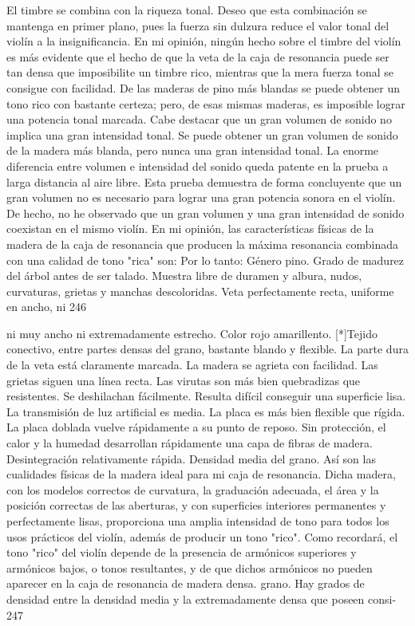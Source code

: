 El timbre se combina con la riqueza tonal. Deseo que esta combinación se mantenga en primer plano, pues la fuerza sin dulzura reduce el valor tonal del violín a la insignificancia. En mi opinión, ningún hecho sobre el timbre del violín es más evidente que el hecho de que la veta de la caja de resonancia puede ser tan densa que imposibilite un timbre rico, mientras que la mera fuerza tonal se consigue con facilidad.
De las maderas de pino más blandas se puede obtener un tono rico con bastante certeza; pero, de esas mismas maderas, es imposible lograr una potencia tonal marcada. Cabe destacar que un gran volumen de sonido no implica una gran intensidad tonal. Se puede obtener un gran volumen de sonido de la madera más blanda, pero nunca una gran intensidad tonal.
La enorme diferencia entre volumen e intensidad del sonido queda patente en la prueba a larga distancia al aire libre. Esta prueba demuestra de forma concluyente que un gran volumen no es necesario para lograr una gran potencia sonora en el violín. De hecho, no he observado que un gran volumen y una gran intensidad de sonido coexistan en el mismo violín.
En mi opinión, las características físicas de la madera de la caja de resonancia que producen la máxima resonancia combinada con una calidad de tono "rica" son:
Por lo tanto: Género pino.
Grado de madurez del árbol antes de ser talado.
Muestra libre de duramen y albura, nudos, curvaturas, grietas y manchas descoloridas.
Veta perfectamente recta, uniforme en ancho, ni
246

ni muy ancho ni extremadamente estrecho. Color rojo amarillento.
[*]Tejido conectivo, entre partes densas del grano, bastante blando y flexible.
La parte dura de la veta está claramente marcada. La madera se agrieta con facilidad. Las grietas siguen una línea recta.
Las virutas son más bien quebradizas que resistentes. Se deshilachan fácilmente. Resulta difícil conseguir una superficie lisa. La transmisión de luz artificial es media. La placa es más bien flexible que rígida.
La placa doblada vuelve rápidamente a su punto de reposo.
Sin protección, el calor y la humedad desarrollan rápidamente una capa de fibras de madera.
Desintegración relativamente rápida. Densidad media del grano.
Así son las cualidades físicas de la madera ideal para mi caja de resonancia. Dicha madera, con los modelos correctos de curvatura, la graduación adecuada, el área y la posición correctas de las aberturas, y con superficies interiores permanentes y perfectamente lisas, proporciona una amplia intensidad de tono para todos los usos prácticos del violín, además de producir un tono "rico". Como recordará, el tono "rico" del violín depende de la presencia de armónicos superiores y armónicos bajos, o tonos resultantes, y de que dichos armónicos no pueden aparecer en la caja de resonancia de madera densa.
grano.
Hay grados de densidad entre la densidad media y la extremadamente densa que poseen consi-
247

